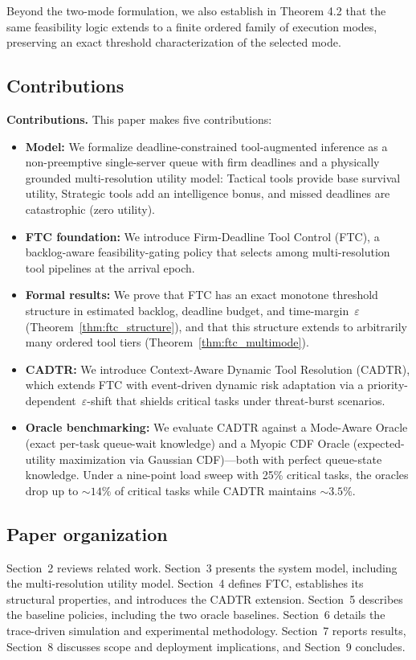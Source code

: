 \documentclass[preprint,12pt]{elsarticle}
\begin{document}
Beyond the two-mode formulation, we also establish in Theorem 4.2 
that the same feasibility logic extends to a finite ordered family
of execution modes, preserving an exact threshold characterization 
of the selected mode.
\subsection{Contributions}
\noindent\textbf{Contributions.} This paper makes five contributions:
\begin{itemize}
  \item \textbf{Model:} We formalize deadline-constrained tool-augmented inference as a non-preemptive single-server queue with firm deadlines and a physically grounded multi-resolution utility model: Tactical tools provide base survival utility, Strategic tools add an intelligence bonus, and missed deadlines are catastrophic (zero utility).
  \item \textbf{FTC foundation:} We introduce Firm-Deadline Tool Control (FTC), a backlog-aware feasibility-gating policy that selects among multi-resolution tool pipelines at the arrival epoch.
  \item \textbf{Formal results:} We prove that FTC has an exact monotone threshold structure in estimated backlog, deadline budget, and time-margin~$\varepsilon$ (Theorem~\ref{thm:ftc_structure}), and that this structure extends to arbitrarily many ordered tool tiers (Theorem~\ref{thm:ftc_multimode}).
  \item \textbf{CADTR:} We introduce Context-Aware Dynamic Tool Resolution (CADTR), which extends FTC with event-driven dynamic risk adaptation via a priority-dependent~$\varepsilon$-shift that shields critical tasks under threat-burst scenarios.
  \item \textbf{Oracle benchmarking:} We evaluate CADTR against a Mode-Aware Oracle (exact per-task queue-wait knowledge) and a Myopic CDF Oracle (expected-utility maximization via Gaussian CDF)---both with perfect queue-state knowledge. Under a nine-point load sweep with 25\% critical tasks, the oracles drop up to ${\sim}14\%$ of critical tasks while CADTR maintains ${\sim}3.5\%$.
\end{itemize}

\subsection{Paper organization}
Section~2 reviews related work. Section~3 presents the system model, including the multi-resolution utility model. Section~4 defines FTC, establishes its structural properties, and introduces the CADTR extension. Section~5 describes the baseline policies, including the two oracle baselines. Section~6 details the trace-driven simulation and experimental methodology. Section~7 reports results, Section~8 discusses scope and deployment implications, and Section~9 concludes.
\end{document}
